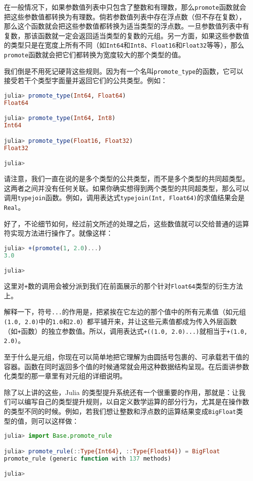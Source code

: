 在一般情况下，如果参数值列表中只包含了整数和有理数，那么\verb|promote|函数就会把这些参数值都转换为有理数。倘若参数值列表中存在浮点数（但不存在复数），那么这个函数就会把这些参数值都转换为适当类型的浮点数。一旦参数值列表中有复数，那该函数就一定会返回适当类型的复数的元组。另一方面，如果这些参数值的类型只是在宽度上所有不同（如\verb|Int64|和\verb|Int8|、\verb|Float16|和\verb|Float32|等等），那么\verb|promote|函数就会把它们都转换为宽度较大的那个类型的值。

我们倒是不用死记硬背这些规则。因为有一个名叫\verb|promote_type|的函数，它可以接受若干个类型字面量并返回它们的公共类型。例如：
\begin{lstlisting}[language=julia]
julia> promote_type(Int64, Float64)
Float64

julia> promote_type(Int64, Int8)
Int64

julia> promote_type(Float16, Float32)
Float32

julia> 
\end{lstlisting}

请注意，我们一直在说的是多个类型的公共类型，而不是多个类型的共同超类型。这两者之间并没有任何关联。如果你确实想得到两个类型的共同超类型，那么可以调用\verb|typejoin|函数。例如，调用表达式\verb|typejoin(Int, Float64)|的求值结果会是\verb|Real|。

好了，不论细节如何，经过前文所述的处理之后，这些数值就可以交给普通的运算符实现方法进行操作了。就像这样：
\begin{lstlisting}[language=julia]
julia> +(promote(1, 2.0)...)
3.0

julia> 
\end{lstlisting}

这里对\verb|+|数的调用会被分派到我们在前面展示的那个针对\verb|Float64|类型的衍生方法上。

解释一下，符号\verb|...|的作用是，把紧挨在它左边的那个值中的所有元素值（如元组\verb|(1.0, 2.0)|中的\verb|1.0|和\verb|2.0|）都平铺开来，并让这些元素值都成为传入外层函数（如\verb|+|函数）的独立参数值。所以，调用表达式\verb|+((1.0, 2.0)...)|就相当于\verb|+(1.0, 2.0)|。

至于什么是元组，你现在可以简单地把它理解为由圆括号包裹的、可承载若干值的容器。函数在同时返回多个值的时候通常就会用这种数据结构呈现。在后面讲参数化类型的那一章里有对元组的详细说明。

除了以上讲的这些，Julia 的类型提升系统还有一个很重要的作用，那就是：让我们可以编写自己的类型提升规则，以自定义数学运算的部分行为，尤其是在操作数的类型不同的时候。例如，若我们想让整数和浮点数的运算结果变成\verb|BigFloat|类型的值，则可以这样做：
\begin{lstlisting}[language=julia]
julia> import Base.promote_rule

julia> promote_rule(::Type{Int64}, ::Type{Float64}) = BigFloat
promote_rule (generic function with 137 methods)

julia>
\end{lstlisting}

